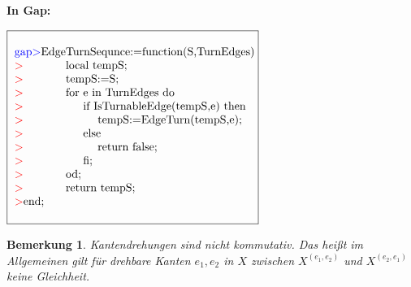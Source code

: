 \documentclass[12pt,titlepage,twoside,cleardoublepage]{article}
\theoremstyle{nummermitklammern}
\newtheorem{bemerkung}[temp]{Bemerkung}
\newtheorem{bemerkung}[zahl]{Bemerkung}
\numberwithin{equation}{section}
\begin{document}
\textbf{In Gap:}
\begin{center}
$\fbox{
\parbox{14cm}{
\begin{tabbing}
\textcolor{blue}{gap$>$}Edge\=TurnSequnce:=function(S,TurnEdges)\\
\textcolor{red}{$>$}\> local tempS;\\
\textcolor{red}{$>$}\> tempS:=S;\\
\textcolor{red}{$>$}\> for \=e in TurnEdges do\\
\textcolor{red}{$>$}\>\> if I\=sTurnableEdge(tempS,e) then\\
\textcolor{red}{$>$}\>\>\> tempS:=EdgeTurn(tempS,e);\\
\textcolor{red}{$>$}\>\> else\\
\textcolor{red}{$>$}\>\>\> return false;\\
\textcolor{red}{$>$}\> \>fi;\\
\textcolor{red}{$>$}\> od;\\
\textcolor{red}{$>$}\> return tempS;\\
\textcolor{red}{$>$}end;
\end{tabbing}
}}$
\end{center}
\begin{bemerkung}
Kantendrehungen sind nicht kommutativ. Das heißt im Allgemeinen gilt für drehbare Kanten $e_1,e_2$ in $X$ zwischen $X^{(e_1,e_2)}$ und $X^{(e_2,e_1)}$ keine Gleichheit. 

\end{bemerkung}
\end{document}
